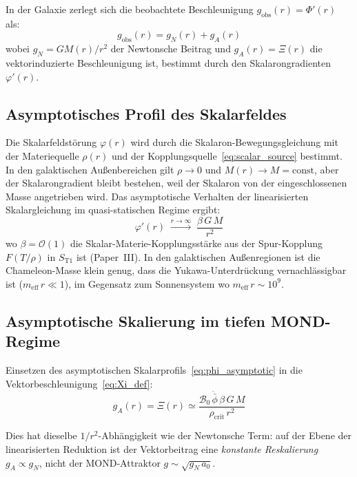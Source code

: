 \documentclass[aps,prd,twocolumn,superscriptaddress,nofootinbib]{revtex4-2}
\begin{document}
In der Galaxie zerlegt sich die beobachtete Beschleunigung $g_{\mathrm{obs}}(r) = \Phi'(r)$ als:
\begin{equation}
g_{\mathrm{obs}}(r) = g_N(r) + g_A(r)
\label{eq:g_obs}
\end{equation}
wobei $g_N = GM(r)/r^2$ der Newtonsche Beitrag und $g_A(r) = \Xi(r)$ die vektorinduzierte Beschleunigung ist, bestimmt durch den Skalarongradienten $\varphi'(r)$.

\subsection{Asymptotisches Profil des Skalarfeldes}
\label{sec:scalar_asymptotic}

Die Skalarfeldst\"orung $\varphi(r)$ wird durch die Skalaron-Bewegungsgleichung mit der Materiequelle $\rho(r)$ und der Kopplungsquelle~\eqref{eq:scalar_source} bestimmt. In den galaktischen Au\ss{}enbereichen gilt $\rho \to 0$ und $M(r) \to M = \mathrm{const}$, aber der Skalaron\-gradient bleibt bestehen, weil der Skalaron von der eingeschlossenen Masse angetrieben wird. Das asymptotische Verhalten der linearisierten Skalargleichung im quasi-statischen Regime ergibt:
\begin{equation}
\varphi'(r) \;\xrightarrow{r \to \infty}\; \frac{\beta\,G\,M}{r^2}
\label{eq:phi_asymptotic}
\end{equation}
wo $\beta = \mathcal{O}(1)$ die Skalar-Materie-Kopplungsst\"arke aus der Spur-Kopplung $F(T/\rho)$ in $S_{\mathrm{T1}}$ ist (Paper~III). In den galaktischen Au\ss{}enregionen ist die Chameleon-Masse klein genug, dass die Yukawa-Unterdr\"uckung vernachl\"assigbar ist ($m_{\mathrm{eff}}\,r \ll 1$), im Gegensatz zum Sonnensystem wo $m_{\mathrm{eff}}\,r \sim 10^{9}$.

\subsection{Asymptotische Skalierung im tiefen MOND-Regime}
\label{sec:deep_mond}

Einsetzen des asymptotischen Skalarprofils~\eqref{eq:phi_asymptotic} in die Vektorbeschleunigung~\eqref{eq:Xi_def}:
\begin{equation}
g_A(r) = \Xi(r) \simeq \frac{\mathcal{B}_0\,\dot{\bar{\phi}}\,\beta\,G\,M}{\rho_{\mathrm{crit}}\,r^2}
\label{eq:g_A_explicit}
\end{equation}

Dies hat dieselbe $1/r^2$-Abh\"angigkeit wie der Newtonsche Term: auf der Ebene der linearisierten Reduktion ist der Vektorbeitrag eine \textit{konstante Reskalierung} $g_A \propto g_N$, nicht der MOND-Attraktor $g \sim \sqrt{g_N\,a_0}$.
\end{document}
